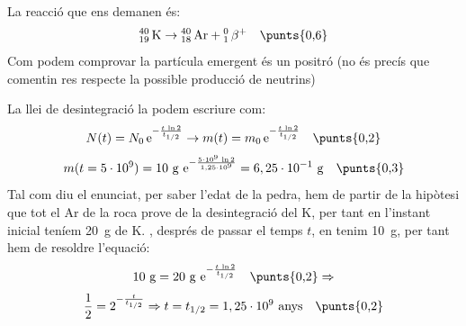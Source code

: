 \begin{solapartat}
La reacció que ens demanen és:
\[ {}^{40}_{19}\,\mathrm{K} \rightarrow {}^{40}_{18}\,\mathrm{Ar} + {}^{0}_{1}\,\beta^{+} \quad \text{\punts{0,6}} \]
Com podem comprovar la partícula emergent és un positró  (no és precís que comentin res respecte la possible producció de neutrins)
\end{solapartat}

\begin{solapartat}
La llei de desintegració la podem escriure com:
\[ N(t) = N_0\,\mathrm{e}^{-\frac{t\,\ln 2}{t_{1/2}}} \rightarrow m(t) = m_0\,\mathrm{e}^{-\frac{t\,\ln 2}{t_{1/2}}} \quad \text{\punts{0,2}} \]
\[ m(t = 5\cdot 10^{9}) = 10\ \mathrm{g}\ \mathrm{e}^{-\frac{5\cdot 10^{9}\,\ln 2}{1,25\cdot 10^{9}}} = 6,25\cdot 10^{-1}\ \mathrm{g} \quad \text{\punts{0,3}} \]
Tal com diu el enunciat, per saber l'edat de la pedra, hem de partir de la hipòtesi que tot el Ar de la roca prove de la desintegració del K, per tant en l'instant inicial teníem 20~g de K. , després de passar el temps $t$, en tenim 10~g, per tant hem de resoldre l'equació:
\[ 10\ \mathrm{g} = 20\ \mathrm{g}\ \mathrm{e}^{-\frac{t\,\ln 2}{t_{1/2}}} \quad \text{\punts{0,2}} \Rightarrow \]
\[ \frac{1}{2} = 2^{-\frac{t}{t_{1/2}}} \Rightarrow t = t_{1/2} = 1,25\cdot 10^{9}\ \text{anys} \quad \text{\punts{0,2}} \]
\end{solapartat}
